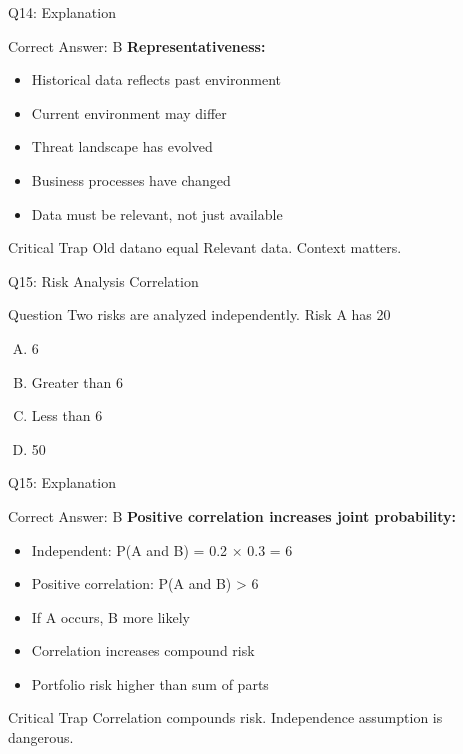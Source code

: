 \documentclass{beamer}
\begin{document}
			\begin{frame}{Q14: Explanation}
				\begin{block}{Correct Answer: B}
					\textbf{Representativeness:}
					\begin{itemize}
						\item Historical data reflects past environment
						\item Current environment may differ
						\item Threat landscape has evolved
						\item Business processes have changed
						\item Data must be relevant, not just available
					\end{itemize}
				\end{block}
				\begin{alertblock}{Critical Trap}
					Old datano equal Relevant data. Context matters.
				\end{alertblock}
			\end{frame}
			
			\begin{frame}{Q15: Risk Analysis Correlation}
				\begin{block}{Question}
					Two risks are analyzed independently. Risk A has 20%
				\end{block}
				\begin{enumerate}[(A)]
					\item 6%
					\item Greater than 6%
					\item Less than 6%
					\item 50%
				\end{enumerate}
			\end{frame}
			
			\begin{frame}{Q15: Explanation}
				\begin{block}{Correct Answer: B}
					\textbf{Positive correlation increases joint probability:}
					\begin{itemize}
						\item Independent: P(A and B) = 0.2 × 0.3 = 6%
						\item Positive correlation: P(A and B) > 6%
						\item If A occurs, B more likely
						\item Correlation increases compound risk
						\item Portfolio risk higher than sum of parts
					\end{itemize}
				\end{block}
				\begin{alertblock}{Critical Trap}
					Correlation compounds risk. Independence assumption is dangerous.
				\end{alertblock}
			\end{frame}
			
\end{document}

